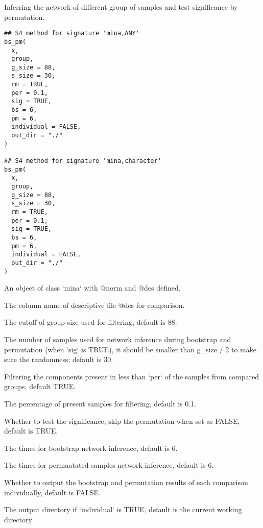 \documentclass[a4paper]{book}
\begin{document}
%
\begin{Description}\relax
Inferring the network of different group of samples and test significance by
permutation.
\end{Description}
%
\begin{Usage}
\begin{verbatim}
## S4 method for signature 'mina,ANY'
bs_pm(
  x,
  group,
  g_size = 88,
  s_size = 30,
  rm = TRUE,
  per = 0.1,
  sig = TRUE,
  bs = 6,
  pm = 6,
  individual = FALSE,
  out_dir = "./"
)

## S4 method for signature 'mina,character'
bs_pm(
  x,
  group,
  g_size = 88,
  s_size = 30,
  rm = TRUE,
  per = 0.1,
  sig = TRUE,
  bs = 6,
  pm = 6,
  individual = FALSE,
  out_dir = "./"
)
\end{verbatim}
\end{Usage}
%
\begin{Arguments}
\begin{ldescription}
\item[\code{x}] An object of class `mina` with @norm and @des defined.

\item[\code{group}] The column name of descriptive file @des for comparison.

\item[\code{g\_size}] The cutoff of group size used for filtering, default is 88.

\item[\code{s\_size}] The number of samples used for network inference during
bootstrap and permutation (when `sig` is TRUE), it should be smaller than
g\_size / 2 to make sure the randomness; default is 30.

\item[\code{rm}] Filtering the components present in less than `per` of the samples
from compared groups, default TRUE.

\item[\code{per}] The percentage of present samples for filtering, default is 0.1.

\item[\code{sig}] Whether to test the significance, skip the permutation when set as
FALSE, default is TRUE.

\item[\code{bs}] The times for bootstrap network inference, default is 6.

\item[\code{pm}] The times for permuatated samples network inference, default is 6.

\item[\code{individual}] Whether to output the bootstrap and permutation results of
each comparison individually, default is FALSE.

\item[\code{out\_dir}] The output directory if `individual` is TRUE, default is the
current working directory
\end{ldescription}
\end{Arguments}
\end{document}
